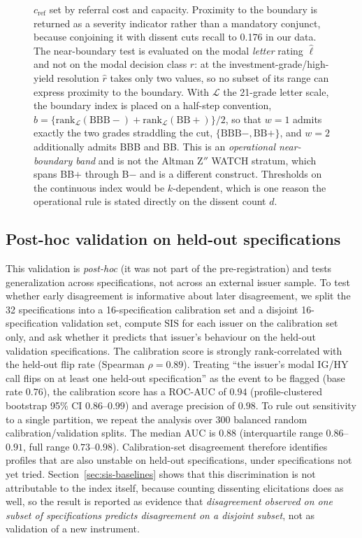 \documentclass[a4paper,fleqn]{cas-sc}
\begin{document}
\begin{figure}[t]
{$c_{\mathrm{ref}}$ set by referral cost and capacity. Proximity to the boundary is returned as a severity indicator rather than a mandatory
conjunct, because conjoining it with dissent cuts recall to 0.176 in our data. The near-boundary test is evaluated on the modal \emph{letter} rating
$\hat{\ell}$ and not on the modal decision class $\hat{r}$: at the investment-grade/high-yield
resolution $\hat{r}$ takes only two values, so no subset of its range can express proximity to the
boundary. With $\mathcal{L}$ the 21-grade letter scale, the boundary index is placed on a
half-step convention, $b=\{\mathrm{rank}_{\mathcal L}(\mathrm{BBB}-)+\mathrm{rank}_{\mathcal
L}(\mathrm{BB}+)\}/2$, so that $w=1$ admits exactly the two grades straddling the cut,
$\{\mathrm{BBB}-,\mathrm{BB}+\}$, and $w=2$ additionally admits BBB and BB. This is an
\emph{operational near-boundary band} and is not the Altman Z$''$ WATCH stratum, which spans
BB$+$ through B$-$ and is a different construct. Thresholds on the continuous index would be $k$-dependent, which is
one reason the operational rule is stated directly on the dissent count $d$.}\label{alg:sis}
\end{figure}

\subsection{Post-hoc validation on held-out specifications}\label{sec:sis-val}
This validation is \emph{post-hoc} (it was not part of the pre-registration) and tests generalization
across specifications, not across an external issuer sample. To test whether early disagreement is informative about later disagreement, we split the 32 specifications into a 16-specification calibration set and a disjoint 16-specification validation set, compute $\mathrm{SIS}$ for each issuer on the calibration set
only, and ask whether it predicts that issuer's behaviour on the held-out validation specifications. The
calibration score is strongly rank-correlated with the held-out flip rate (Spearman $\rho=0.89$). Treating
``the issuer's modal IG/HY call flips on at least one held-out specification'' as the event to be flagged
(base rate $0.76$), the calibration score has a ROC-AUC of $0.94$ (profile-clustered bootstrap 95\%
CI $0.86$--$0.99$) and average precision of $0.98$. To rule out sensitivity to a single partition, we
repeat the analysis over 300 balanced random calibration/validation splits. The median AUC is $0.88$
(interquartile range $0.86$--$0.91$, full range $0.73$--$0.98$). Calibration-set disagreement therefore identifies profiles that are also unstable on held-out specifications, under specifications not yet
tried. Section~\ref{sec:sis-baselines} shows that this discrimination is not attributable to the
index itself, because counting dissenting elicitations does as well, so the result is reported as evidence
that \emph{disagreement observed on one subset of specifications predicts disagreement on a disjoint subset}, not as validation of a new instrument.
\end{document}
